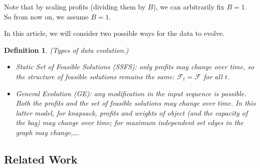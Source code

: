 \documentclass[a4paper]{book}
\newtheorem{definition}{Definition}
\begin{document}
Note that by scaling profits (dividing them by $B$), we can arbitrarily fix $B=1$. So from now on, we assume $B=1$.



In this article, we will consider two possible ways for the data to evolve. 

\begin{definition}
\emph{(Types of data evolution.)}
\begin{itemize}
\item \emph{Static Set of Feasible Solutions (SSFS):}  only profits may change over time, so the structure of feasible solutions remains the same: $\mathcal{F}_t=\mathcal{F}$ for all $t$. 

\item \emph{General Evolution (GE):}  any modification in the input sequence is possible. Both the profits and the set of feasible solutions may change over time. In this latter model, for knapsack, profits and weights of object (and the capacity of the bag) may change over time; for maximum independent set edges in the graph may change,\dots.   
\end{itemize}
\end{definition}


\subsection{Related Work}
\end{document}
